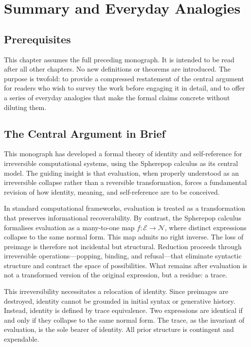 \documentclass[12pt, oneside]{amsbook}
\theoremstyle{plain}
\theoremstyle{definition}
\theoremstyle{remark}
\newcommand{\Expr}{\mathcal{E}}
\newcommand{\NF}{\mathcal{N}}
\newcommand{\evalf}{f}
\begin{document}
\chapter{Summary and Everyday Analogies}
\label{ch:summary}

\section{Prerequisites}

This chapter assumes the full preceding monograph. It is intended to be read
after all other chapters. No new definitions or theorems are introduced.
The purpose is twofold: to provide a compressed restatement of the central
argument for readers who wish to survey the work before engaging it in detail,
and to offer a series of everyday analogies that make the formal claims
concrete without diluting them.

\section{The Central Argument in Brief}

This monograph has developed a formal theory of identity and self-reference
for irreversible computational systems, using the Spherepop calculus as its
central model. The guiding insight is that evaluation, when properly understood
as an irreversible collapse rather than a reversible transformation, forces a
fundamental revision of how identity, meaning, and self-reference are to be
conceived.

In standard computational frameworks, evaluation is treated as a transformation
that preserves informational recoverability. By contrast, the Spherepop calculus
formalises evaluation as a many-to-one map $\evalf : \Expr \to \NF$, where
distinct expressions collapse to the same normal form. This map admits no right
inverse. The loss of preimage is therefore not incidental but structural.
Reduction proceeds through irreversible operations---popping, binding, and
refusal---that eliminate syntactic structure and contract the space of
possibilities. What remains after evaluation is not a transformed version of
the original expression, but a residue: a trace.

This irreversibility necessitates a relocation of identity. Since preimages are
destroyed, identity cannot be grounded in initial syntax or generative history.
Instead, identity is defined by trace equivalence. Two expressions are identical
if and only if they collapse to the same normal form. The trace, as the invariant
of evaluation, is the sole bearer of identity. All prior structure is contingent
and expendable.
\end{document}
